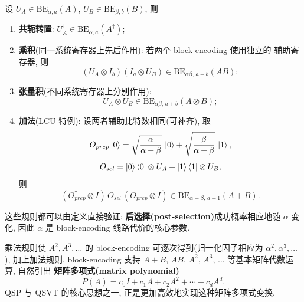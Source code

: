 \documentclass[utf8]{article} %
\numberwithin{equation}{section}   %
\newtheorem{Prop}{\hskip 2em {\color{cyan} 命题}}[subsection]
\newtheorem{Note}{\hskip 2em {\color{red} 注}}[subsection]
\begin{document}
\begin{Prop}
    设 $U_A \in \mathrm{BE}_{\alpha,a}(A)$, $U_B \in \mathrm{BE}_{\beta,b}(B)$, 则
    \begin{enumerate}
        \item \textbf{共轭转置}: $U_A^\dagger \in \mathrm{BE}_{\alpha,a}(A^\dagger)$;
        \item \textbf{乘积}(同一系统寄存器上先后作用): 若两个 block-encoding 使用独立的
        辅助寄存器, 则
        \begin{equation}
            (U_A \otimes I_b)(I_a \otimes U_B) \in \mathrm{BE}_{\alpha\beta,\,a+b}(AB);
        \end{equation}
        \item \textbf{张量积}(不同系统寄存器上分别作用):
        \begin{equation}
            U_A \otimes U_B \in \mathrm{BE}_{\alpha\beta,\,a+b}(A \otimes B);
        \end{equation}
        \item \textbf{加法}(LCU 特例): 设两者辅助比特数相同(可补齐), 取
        \begin{equation*}
            O_{prep}\ket{0} = \sqrt{\frac{\alpha}{\alpha+\beta}}\,\ket{0} + \sqrt{\frac{\beta}{\alpha+\beta}}\,\ket{1},
        \end{equation*}
        \begin{equation*}
            O_{sel} = \ket{0}\bra{0}\otimes U_A + \ket{1}\bra{1}\otimes U_B,
        \end{equation*}
        则
        \begin{equation}
            (O_{prep}^\dagger \otimes I)\, O_{sel}\, (O_{prep} \otimes I)
            \in \mathrm{BE}_{\alpha+\beta,\,a+1}(A + B).
        \end{equation}
    \end{enumerate}
    这些规则都可以由定义直接验证; \textbf{后选择(post-selection)}成功概率相应地随 $\alpha$ 变化,
    因此 $\alpha$ 是 block-encoding 线路代价的核心参数.
\end{Prop}

\begin{Note}[矩阵多项式]
    乘法规则使 $A^2, A^3, \dots$ 的 block-encoding 可逐次得到(归一化因子相应为
    $\alpha^2, \alpha^3, \dots$), 加上加法规则, block-encoding 支持
    $A + B$, $AB$, $A^2$, $A^3$, $\dots$ 等基本矩阵代数运算, 自然引出
    \textbf{矩阵多项式(matrix polynomial)}
    \begin{equation}
        P(A) = c_0 I + c_1 A + c_2 A^2 + \cdots + c_d A^d.
    \end{equation}
    QSP 与 QSVT 的核心思想之一, 正是更加高效地实现这种矩阵多项式变换.
\end{Note}
\end{document}
